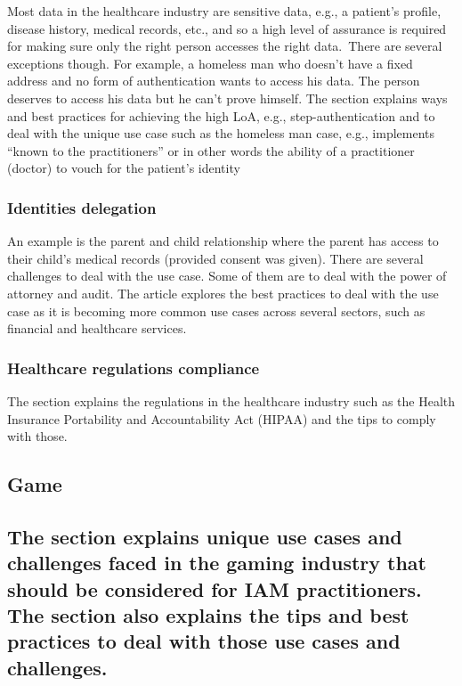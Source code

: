 Most data in the healthcare industry are sensitive data, e.g., a
patient's profile, disease history, medical records, etc., and so a high
level of assurance is required for making sure only the right person
accesses the right data.~There are several exceptions though. For
example, a homeless man who doesn't have a fixed address and no form of
authentication wants to access his data. The person deserves to access
his data but he can't prove himself. The section explains ways and best
practices for achieving the high LoA, e.g., step-authentication and to
deal with the unique use case such as the homeless man case, e.g.,
implements ``known to the practitioners'' or in other words the ability
of a practitioner (doctor) to vouch for the patient's identity

\hypertarget{identities-delegation}{%
\subsubsection{Identities delegation}\label{identities-delegation}}

An example is the parent and child relationship where the parent has
access to their child's medical records (provided consent was given).
There are several challenges to deal with the use case. Some of them are
to deal with the power of attorney and audit. The article explores the
best practices to deal with the use case as it is becoming more common
use cases across several sectors, such as financial and healthcare
services.

\hypertarget{healthcare-regulations-compliance}{%
\subsubsection{Healthcare regulations
compliance}\label{healthcare-regulations-compliance}}

The section explains the regulations in the healthcare industry such as
the Health Insurance Portability and Accountability Act (HIPAA) and the
tips to comply with those.

\hypertarget{game}{%
\subsection{Game}\label{game}}

\hypertarget{the-section-explains-unique-use-cases-and-challenges-faced-in-the-gaming-industry-that-should-be-considered-for-iam-practitioners.-the-section-also-explains-the-tips-and-best-practices-to-deal-with-those-use-cases-and-challenges.}{%
\subsection{The section explains unique use cases and challenges
faced in the gaming industry that should be considered for IAM
practitioners. The section also explains the tips and best practices to
deal with those use cases and
challenges.}\label{the-section-explains-unique-use-cases-and-challenges-faced-in-the-gaming-industry-that-should-be-considered-for-iam-practitioners.-the-section-also-explains-the-tips-and-best-practices-to-deal-with-those-use-cases-and-challenges.}}

